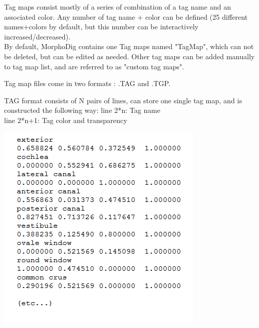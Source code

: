 Tag maps consist mostly of a series of combination of a tag name and an associated color.  Any number of tag name + color can be defined (25 different names+colors by default, but this number can be interactively increased/decreased).\\
By default, MorphoDig contains one Tag maps named "TagMap", which can not be deleted, but can be edited as needed. Other tag maps can be added manually to tag map list, and are referred to as "custom tag maps". 


Tag map files come in two formats : .TAG and .TGP.

\begin{minipage}{0.55\textwidth}
TAG format consists of N pairs of lines, can store one single tag map, and is constructed the following way:
line 2*n: Tag name\\
line 2*n+1: Tag color and transparency
\end{minipage}  
 \begin{minipage}{0.45\textwidth}\centering
  \includegraphics[scale=0.5]{images/07/tagmaps/TAG_file.png}
 \end{minipage} 

\noindent

